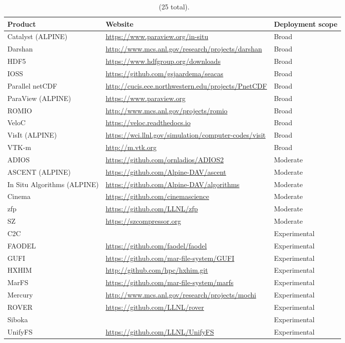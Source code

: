 \begin{table}[H]
\begin{tabularx}{\textwidth}{|X|l|X|}\hline
		\rowcolor{LightCyan}
	\textbf{Product} & \textbf{Website} & \textbf{Deployment scope}\\\hline
	Catalyst (ALPINE) & \url{https://www.paraview.org/in-situ} & Broad\\\hline
	Darshan & \url{http://www.mcs.anl.gov/research/projects/darshan} & Broad\\\hline
	HDF5 & \url{https://www.hdfgroup.org/downloads} & Broad\\\hline
	IOSS & \url{https://github.com/gsjaardema/seacas} & Broad\\\hline
	Parallel netCDF & \url{http://cucis.ece.northwestern.edu/projects/PnetCDF} & Broad\\\hline
	ParaView (ALPINE) & \url{https://www.paraview.org} & Broad\\\hline
	ROMIO & \url{http://www.mcs.anl.gov/projects/romio} & Broad\\\hline
	VeloC & \url{https://veloc.readthedocs.io} & Broad\\\hline
	VisIt (ALPINE) & \url{https://wci.llnl.gov/simulation/computer-codes/visit} & Broad\\\hline
	VTK-m & \url{http://m.vtk.org} & Broad\\\hline

	ADIOS & \url{https://github.com/ornladios/ADIOS2} & Moderate\\\hline
	ASCENT (ALPINE) & \url{https://github.com/Alpine-DAV/ascent} & Moderate\\\hline
	In Situ Algorithms (ALPINE) & \url{https://github.com/Alpine-DAV/algorithms} & Moderate\\\hline
	Cinema & \url{https://github.com/cinemascience} & Moderate\\\hline
	zfp & \url{https://github.com/LLNL/zfp} & Moderate\\\hline
	SZ & \url{https://szcompressor.org} & Moderate\\\hline

	C2C &  & Experimental\\\hline
	FAODEL & \url{https://github.com/faodel/faodel} & Experimental\\\hline
	GUFI & \url{https://github.com/mar-file-system/GUFI} & Experimental\\\hline
	HXHIM & \url{http://github.com/hpc/hxhim.git} & Experimental\\\hline
	MarFS & \url{https://github.com/mar-file-system/marfs} & Experimental\\\hline
	Mercury & \url{http://www.mcs.anl.gov/research/projects/mochi} & Experimental\\\hline
	ROVER & \url{https://github.com/LLNL/rover}   & Experimental\\\hline
	Siboka &  & Experimental\\\hline
	UnifyFS & \url{https://github.com/LLNL/UnifyFS} & Experimental\\\hline
\end{tabularx}
\caption{\label{table:vizdata-products} \dataviz~(25 total).}
\end{table}



